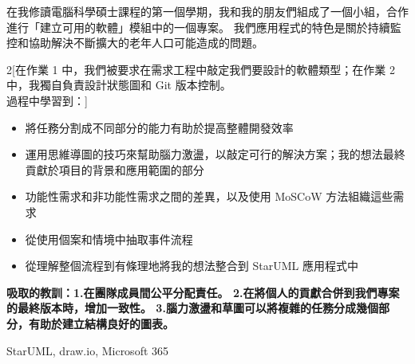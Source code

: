 \documentclass[11 pt,oneside,a4paper,titlepage]{article}
\begin{document}
{\begin{minipage}{20.4cm}
    \vspace*{0.22cm}

    {在我修讀電腦科學碩士課程的第一個學期，我和我的朋友們組成了一個小組，合作進行「建立可用的軟體」模組中的一個專案。
我們應用程式的特色是關於持續監控和協助解決不斷擴大的老年人口可能造成的問題。\\
    \begin{multicols}{2}[在作業 1 中，我們被要求在需求工程中敲定我們要設計的軟體類型；在作業 2 中，我獨自負責設計狀態圖和 Git 版本控制。\\過程中學習到：]
    \begin{itemize}[label=\Large\textbullet, left=0pt]
        \item 將任務分割成不同部分的能力有助於提高整體開發效率
        \item 運用思維導圖的技巧來幫助腦力激盪，以敲定可行的解決方案；我的想法最終貢獻於項目的背景和應用範圍的部分
        \item 功能性需求和非功能性需求之間的差異，以及使用 MoSCoW 方法組織這些需求
        \item 從使用個案和情境中抽取事件流程
        \item 從理解整個流程到有條理地將我的想法整合到 StarUML 應用程式中
    \end{itemize}
    \end{multicols}
    \textbf{吸取的教訓：1.在團隊成員間公平分配責任。 2.在將個人的貢獻合併到我們專案的最終版本時，增加一致性。 3.腦力激盪和草圖可以將複雜的任務分成幾個部分，有助於建立結構良好的圖表。}}
    { StarUML, draw.io, Microsoft 365}

\end{minipage}}
\end{document}
